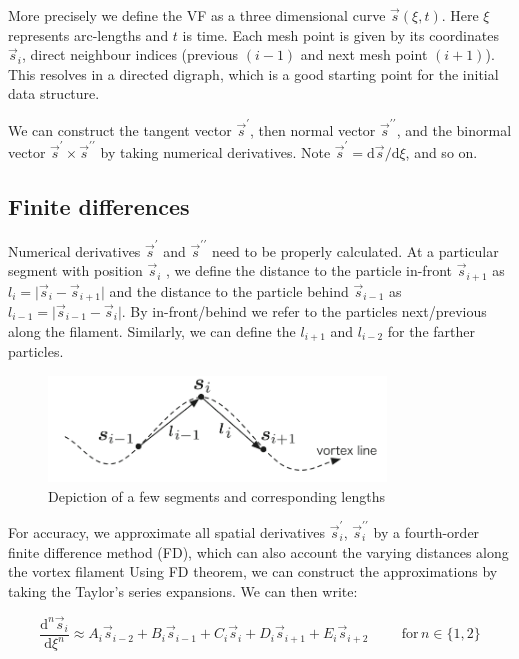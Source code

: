 More precisely we define the VF as a three dimensional curve
$\vec{s}(\xi, t)$. Here $\xi$ represents arc-lengths and $t$ is time. Each mesh point is given by its coordinates $\vec{s}_i$, direct neighbour indices (previous $(i-1)$ and next mesh point $(i+1)$). This resolves in a directed digraph, which is a good starting point for the initial data structure.

We can construct the tangent vector $\vec{s}^{\prime}$, then normal vector $\vec{s}^{\prime\prime}$, and the binormal vector $\vec{s}^{\prime} \times \vec{s}^{\prime\prime}$ by taking numerical derivatives. Note $\vec{s}^{\prime} = \text{d}\vec{s} / \text{d}\xi$,
and so on.

\subsection*{Finite differences}

Numerical derivatives $\vec{s}^{\prime}$ and $\vec{s}^{\prime\prime}$ need to be properly calculated. At a particular segment with position $\vec{s}_i$ , we define the distance to the particle in-front $\vec{s}_{i+1}$ as $l_{i} = \vert \vec{s}_i - \vec{s}_{i+1} \vert$ and the distance to the particle behind
$\vec{s}_{i-1}$ as $l_{i-1} = \vert \vec{s}_{i-1} - \vec{s}_i \vert$.
By in-front/behind we refer to the particles next/previous along the filament. Similarly, we can define the $l_{i+1}$ and $l_{i-2}$ for the farther particles.

\begin{figure}[h]
	\centering
	\includegraphics[width=0.8\textwidth]{graphics/simul/finite-diff}
	\caption{Depiction of a few segments and corresponding lengths}
\end{figure}

For accuracy, we approximate all spatial derivatives $\vec{s}_i^{\prime}$, $\vec{s}_i^{\prime\prime}$ by a
fourth-order finite difference method (FD), which can also account the
varying distances along the vortex filament Using FD theorem, we can construct the approximations by taking the Taylor's series expansions. We can then write:

\begin{equation}
\frac{\text{d}^n\vec{s}_i}{\text{d}\xi^n} \approx
A_i\vec{s}_{i-2} +
B_i\vec{s}_{i-1} +
C_i\vec{s}_{i} +
D_i\vec{s}_{i+1} +
E_i\vec{s}_{i+2}
\hspace{1cm}
\text{for} \,n\in\{1,2\}
\end{equation}

